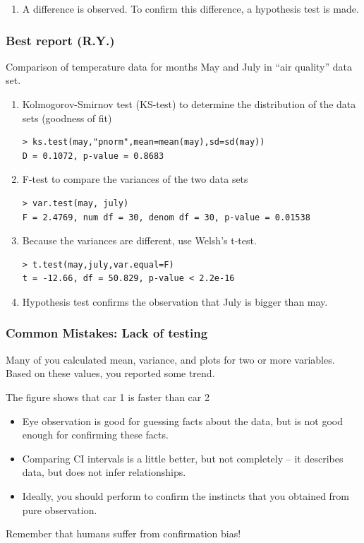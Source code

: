 \documentclass[10pt]{beamer}
\begin{document}
\begin{frame}
{\begin{enumerate}
  \item A difference is observed. To confirm this difference, a hypothesis test is made.
  \end{enumerate}}
\end{frame}

\begin{frame}
  \frametitle{Best report (R.Y.)}
  {\small
  \begin{block}{}
    Comparison of temperature data for months May and July in ``air quality'' data set.
  \end{block}

  \begin{enumerate}
  \item Kolmogorov-Smirnov test (KS-test) to determine the
    distribution of the data sets (goodness of fit)
\begin{verbatim}
> ks.test(may,"pnorm",mean=mean(may),sd=sd(may))
D = 0.1072, p-value = 0.8683
\end{verbatim}
  \item F-test to compare the variances of the two data sets
\begin{verbatim}
> var.test(may, july)
F = 2.4769, num df = 30, denom df = 30, p-value = 0.01538
\end{verbatim}
  \item Because the variances are different, use Welsh's t-test.
\begin{verbatim}
> t.test(may,july,var.equal=F)
t = -12.66, df = 50.829, p-value < 2.2e-16
\end{verbatim}
  \item Hypothesis test confirms the observation that July is bigger than may.
  \end{enumerate}}
\end{frame}

\begin{frame}
  \frametitle{Common Mistakes: Lack of testing} 
   {\small 

     Many of you calculated mean, variance, and plots for two or more
     variables. Based on these values, you reported some trend.

     \begin{block}{}
       The figure shows that car 1 is faster than car 2
     \end{block}
     
     \begin{itemize}
     \item Eye observation is good for guessing facts about the data,
       but is not good enough for confirming these facts.
     \item Comparing CI intervals is a little better, but not
       completely -- it describes data, but does not infer
       relationships.
     \item Ideally, you should perform  to
       confirm the instincts that you obtained from pure observation.
     \end{itemize}

     \alert{Remember that humans suffer from confirmation bias!}

   }
\end{frame}
\end{document}
